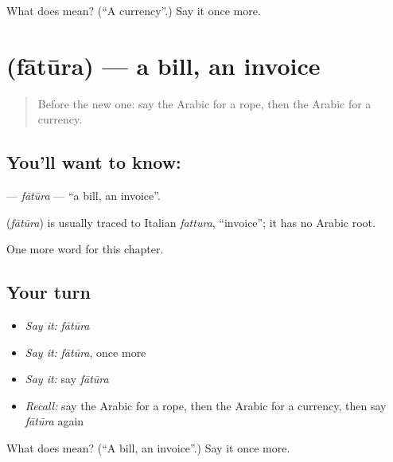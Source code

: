 \begin{tcolorbox}[breakable,colback=teal!4,colframe=teal!35!black,title={Before you move on}]
What does  mean? (\textquotedblleft{}A currency\textquotedblright{}.) Say it once more.
\end{tcolorbox}
\section[\texorpdfstring{\ar{فاتورة} (fātūra)}{فاتورة (fātūra)}]{ (fātūra) — a bill, an invoice}

\label{lesson:AR-C188-fatura}



\begin{quote}
Before the new one: say the Arabic for a rope, then the Arabic for a currency.
\end{quote}

\subsection*{You'll want to know: }
\textbf{} — \emph{fātūra} — \textquotedblleft{}a bill, an invoice\textquotedblright{}.

\begin{cousinweb}
\textbf{} (\emph{fātūra}) is usually traced to Italian \emph{fattura}, \textquotedblleft{}invoice\textquotedblright{}; it has no Arabic root.
\end{cousinweb}

\begin{grammarlens}[title={What you've built}]
One more word for this chapter.
\end{grammarlens}

\subsection*{Your turn}
\begin{itemize}
\raggedright
  \item \emph{Say it:} \emph{fātūra}
  \item \emph{Say it:} \emph{fātūra}, once more
  \item \emph{Say it:} say \emph{fātūra}
  \item \emph{Recall:} say the Arabic for a rope, then the Arabic for a currency, then say \emph{fātūra} again
\end{itemize}

\begin{tcolorbox}[breakable,colback=teal!4,colframe=teal!35!black,title={Before you move on}]
What does  mean? (\textquotedblleft{}A bill, an invoice\textquotedblright{}.) Say it once more.
\end{tcolorbox}
